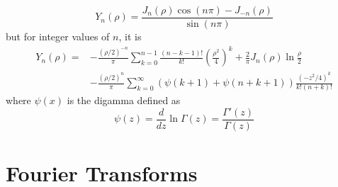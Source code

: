 \documentclass{article}
\newcommand{\od}[2]{\frac{d #1}{d #2}}
\theoremstyle{definition}
\begin{document}
\begin{equation*}
    Y_n(\rho)=\frac{J_n(\rho)\cos(n\pi)-J_{-n}(\rho)}{\sin(n\pi)}
\end{equation*}
but for integer values of $n$, it is 
\begin{equation*}
    \begin{split}
        Y_n(\rho) =& - \frac{(\rho/2)^{-n}}{\pi} \sum^{n-1}_{k=0} \frac{(n-k-1)!}{k!} \left( \frac{\rho^2}{4} \right)^k + \frac{2}{\pi} J_n(\rho) \ln \frac{\rho}{2} \\&- \frac{(\rho/2)^n}{\pi} \sum^\infty_{k=0} (\psi (k+1)+\psi (n+k+1)) \frac{(-z^2/4)^k}{k!(n+k)!}
    \end{split}
\end{equation*}
where $\psi(x)$ is the digamma defined as
\begin{equation*}
    \psi (z) = \od{}{z}\ln \Gamma (z) = \frac{\Gamma '(z)}{\Gamma(z)}
\end{equation*}
\section{Fourier Transforms}
\end{document}
